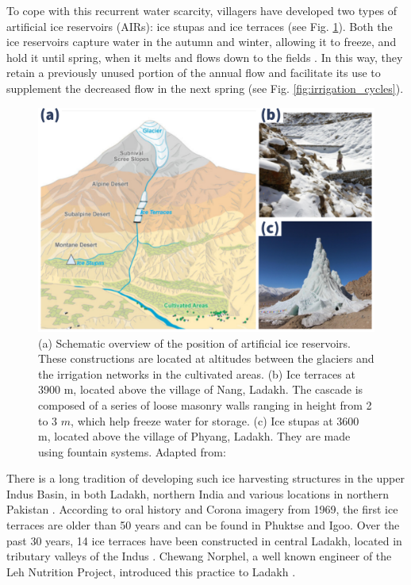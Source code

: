 To cope with this recurrent water scarcity, villagers have developed two types of artificial ice reservoirs
(AIRs): ice stupas and ice terraces (see Fig. \ref{fig:AIRforms}). Both the ice reservoirs capture water in the
autumn and winter, allowing it to freeze, and hold it until spring, when it melts and flows down to the fields
\citep{ipccChapterHighMountain2019, vinceGlacierMan2009, clouseLadakhArtificialGlaciers2017,
nusserSociohydrologyArtificialGlaciers2019}. In this way, they retain a previously unused portion of the annual
flow and facilitate its use to supplement the decreased flow in the next spring (see Fig.
\ref{fig:irrigation_cycles}).

\begin{figure}[t]
\centering
\includegraphics[width=12cm]{figs/AIR_forms.jpg}

\caption{(a) Schematic overview of the position of artificial ice reservoirs. These constructions are located at
  altitudes between the glaciers and the irrigation networks in the cultivated areas. (b) Ice terraces at 3900
  m, located above the village of Nang, Ladakh. The cascade is composed of a series of loose masonry walls
  ranging in height from 2 to 3 $m$, which help freeze water for storage. (c) Ice stupas at 3600 m, located
above the village of Phyang, Ladakh. They are made using fountain systems. Adapted from:
\cite{nusserLocalKnowledgeGlobal2016}}

\label{fig:AIRforms}
\end{figure}

There is a long tradition of developing such ice harvesting structures in the upper Indus Basin, in both Ladakh,
northern India \citep{labbalTraditionalOasesLadakh2000, nusserIrrigationDevelopmentUpper2012} and various
locations in northern Pakistan \citep{kreutzmannScarcityOpulenceWater2011}. According to oral history and Corona
imagery from 1969, the first ice terraces are older than 50 years and can be found in Phuktse and Igoo. Over the
past 30 years, 14 ice terraces have been constructed in central Ladakh, located in tributary valleys of the
Indus \citep{norphelArtificialGlacierHigh2009, nusserSociohydrologyArtificialGlaciers2019}. Chewang Norphel, a
well known engineer of the Leh Nutrition Project, introduced this practice to Ladakh
\citep{vinceGlacierMan2009}.

